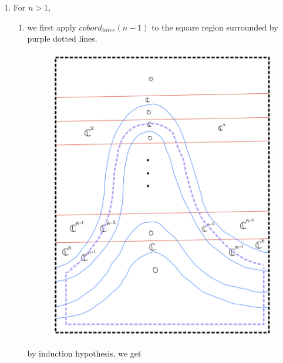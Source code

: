 \begin{enumerate}[label = (\roman*)]
\item For $n>1$,
\begin{enumerate}[label = (Step \arabic*)]
\item we first apply $cobord_{inter}(n-1)$ to the square region surrounded by purple dotted lines.

\begin{figure}[H]
    \centering
    \includegraphics[scale = 0.95]{diagrams/cobord_inter/4.png}
    \caption{}
    \label{fig:your-label}
\end{figure}

by induction hypothesis, we get


\end{enumerate}
\end{enumerate}
